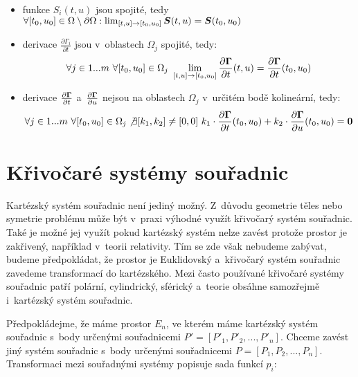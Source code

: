 \begin{itemize}
\item funkce \(S_i(t, u)\) jsou spojité, tedy \(\forall [t_0, u_0] \in \Omega \setminus \partial \Omega: \lim_{[t, u] \to [t_0, u_0]} \boldsymbol{S}(t, u) = \boldsymbol{S}(t_0, u_0)\)

\item derivace \(\frac{\partial \Gamma_i}{\partial t}\) jsou v~oblastech \(\Omega_j\) spojité, tedy:
\begin{equation}
\forall j \in 1...m \ \forall [t_0, u_0] \in \Omega_j \ \lim_{[t, u] \to [t_0, u_0]} \frac{\partial \vect{\Gamma}}{\partial t}(t, u) = \frac{\partial \vect{\Gamma}}{\partial t}(t_0, u_0)
\end{equation}

\item derivace \(\frac{\partial \boldsymbol{\Gamma}}{\partial t}\) a~\(\frac{\partial \boldsymbol{\Gamma}}{\partial u}\) nejsou na oblastech \(\Omega_j\) v~určitém bodě kolineární, tedy:
\begin{equation}
\forall j \in 1...m \ \forall [t_0, u_0] \in \Omega_j \not \exists [k_1, k_2] \neq [0, 0] \ k_1 \cdot \frac{\partial \boldsymbol{\Gamma}}{\partial t}(t_0, u_0) + k_2 \cdot \frac{\partial \boldsymbol{\Gamma}}{\partial u}(t_0, u_0) = \boldsymbol{0}
\end{equation}

\end{itemize}



\section{Křivočaré systémy souřadnic}

Kartézský systém souřadnic není jediný možný. Z~důvodu geometrie těles nebo symetrie problému může být v~praxi výhodné využít křivočarý systém souřadnic. Také je možné jej využít pokud kartézský systém nelze zavést protože prostor je zakřivený, například v~teorii relativity. Tím se zde však nebudeme zabývat, budeme předpokládat, že prostor je Euklidovský a~křivočarý systém souřadnic zavedeme transformací do kartézského. Mezi často používané křivočaré systémy souřadnic patří polární, cylindrický, sférický a~teorie obsáhne samozřejmě i~kartézský systém souřadnic.

Předpokládejme, že máme prostor \(E_n\), ve kterém máme kartézský systém souřadnic s~body určenými souřadnicemi \(P' = [P'_1, P'_2, ..., P'_n]\). Chceme zavést jiný systém souřadnic s~body určenými souřadnicemi \(P = [P_1, P_2, ..., P_n]\). Transformaci mezi souřadnými systémy popisuje sada funkcí \(p_i\):

